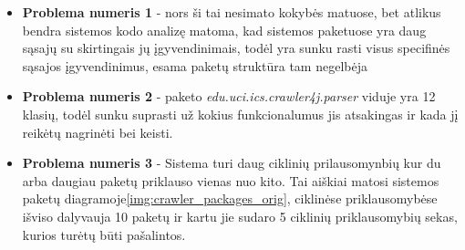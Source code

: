 \begin{itemize}
    \item \textbf{Problema numeris 1} - nors ši tai nesimato kokybės matuose, bet atlikus bendra sistemos kodo analizę matoma,
    kad sistemos paketuose yra daug sąsajų su skirtingais jų įgyvendinimais, todėl yra sunku
    rasti visus specifinės sąsajos įgyvendinimus, esama paketų struktūra tam negelbėja
    \item \textbf{Problema numeris 2} - paketo \textit{edu.uci.ics.crawler4j.parser} viduje yra 12 klasių, todėl sunku suprasti už kokius funkcionalumus jis atsakingas
    ir kada jį reikėtų nagrinėti bei keisti.
    \item \textbf{Problema numeris 3} - Sistema turi daug ciklinių prilausomynbių kur du arba daugiau paketų priklauso vienas nuo kito.
    Tai aiškiai matosi sistemos paketų diagramoje\ref{img:crawler_packages_orig}, ciklinėse priklausomybėse išviso dalyvauja 10 paketų ir kartu jie sudaro 5 ciklinių priklausomybių sekas,
    kurios turėtų būti pašalintos.
\end{itemize}

